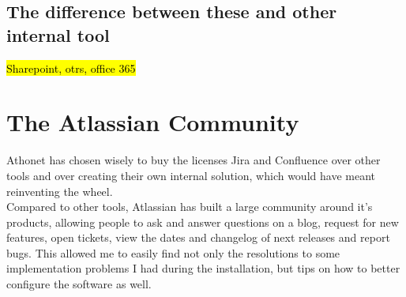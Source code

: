 	\subsection{The difference between these and other internal tool}
		\hl{Sharepoint, otrs, office 365}

\section{The Atlassian Community}
	Athonet has chosen wisely to buy the licenses Jira and Confluence over other tools and over creating their own internal solution, which would have meant reinventing the wheel.\\
	Compared to other tools, Atlassian has built a large community around it's products, allowing people to ask and answer questions on a blog, request for new features, open tickets, view the dates and changelog of next releases and report bugs.
	This allowed me to easily find not only the resolutions to some implementation problems I had during the installation, but tips on how to better configure the software as well.

